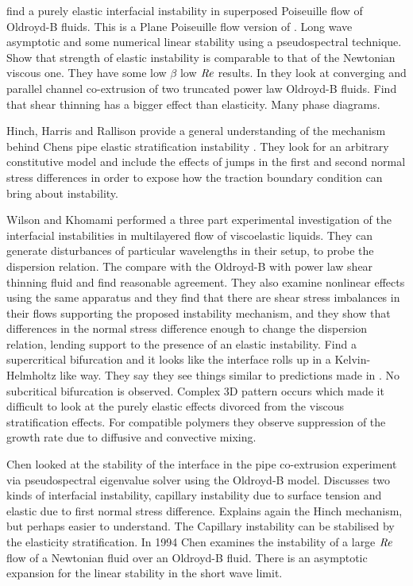 \documentclass{jfm}
\newcommand\Rey{\mbox{\textit{Re}}}  %
\begin{document}
\citet{Su1992a} find a purely elastic interfacial instability in superposed
Poiseuille flow of Oldroyd-B fluids. This is a Plane Poiseuille flow version of
\citep{Chen1992a}. Long wave asymptotic and some numerical linear stability
using a pseudospectral technique. Show that strength of elastic instability is
comparable to that of the Newtonian viscous one. They have some low $\beta$ low
$\Rey$ results. In \citet{Su1992b} they look at converging and parallel channel
co-extrusion of two truncated power law Oldroyd-B fluids.  Find that shear
thinning has a bigger effect than elasticity.  Many phase diagrams.

Hinch, Harris and Rallison \citep{Hinch1992} provide a general understanding of
the mechanism behind Chens pipe elastic stratification instability
\citep{Chen1991a}. They look for an arbitrary constitutive model and include
the effects of jumps in the first and second normal stress differences in order
to expose how the traction boundary condition can bring about instability.

Wilson and Khomami \citep{Wilson1992, Wilson1993a, Wilson1993b} performed a
three part experimental investigation of the interfacial instabilities in
multilayered flow of viscoelastic liquids. They can generate disturbances of
particular wavelengths in their setup, to probe the dispersion relation. The
compare with the Oldroyd-B with power law shear thinning fluid and find
reasonable agreement. They also examine nonlinear effects \citep{Wilson1993a}
using the same apparatus and they find that there are shear stress imbalances
in their flows supporting the proposed instability mechanism, and they show
that differences in the normal stress difference enough to change the
dispersion relation, lending support to the presence of an elastic instability.
Find a supercritical bifurcation and it looks like the interface rolls up in a
Kelvin-Helmholtz like way. They say they see things similar to predictions made
in \citet{Renardy1989}. No subcritical bifurcation is observed. Complex 3D
pattern occurs which made it difficult to look at the purely elastic effects
divorced from the viscous stratification effects. For compatible polymers
\citep{Wilson1993b} they observe suppression of the growth rate due to diffusive
and convective mixing.

Chen \citep{Chen1993} looked at the stability of the interface in the pipe
co-extrusion experiment via pseudospectral eigenvalue solver using the
Oldroyd-B model. Discusses two kinds of interfacial instability, capillary
instability due to surface tension and elastic due to first normal stress
difference.  Explains again the Hinch mechanism, but perhaps easier to
understand. The Capillary instability can be stabilised by the elasticity
stratification. In 1994 \citep{Chen1994} Chen examines the instability of a
large $\Rey$ flow of a Newtonian fluid over an Oldroyd-B fluid. There is an
asymptotic expansion for the linear stability in the short wave limit.
\end{document}
